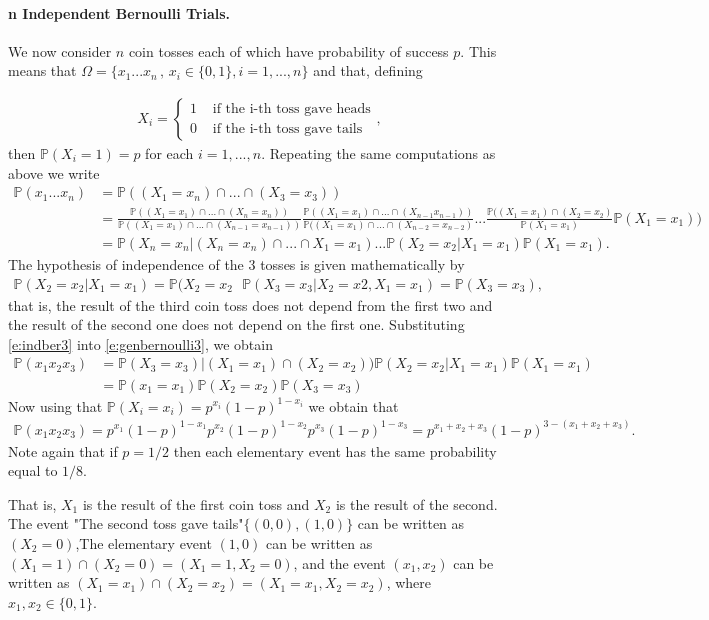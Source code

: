 \documentclass[12pt]{article}
\newcommand{\<}{{\langle \!\! \langle}}
\renewcommand{\>}{{\rangle \!\! \rangle}}
\newcommand{\bel}[2]{\begin{equation} \label{#1} \begin{split} #2
 					\end{split} \end{equation}}
\begin{document}
 \paragraph{ n Independent Bernoulli Trials.}
We now consider $n$ coin tosses each of which have probability of success $p$. This means that $\Omega= \{x_1...x_n\,,\, x_i\in\{0,1\},i=1,...,n\}$ and that, defining

\bel{}{X_i=\begin{cases}
1 & \textrm{ if the i-th toss gave heads}\\
0 & \textrm{ if the i-th toss gave tails}
\end{cases},}
then $\mathbb{P}(X_i = 1) = p$ for each $i=1,...,n$. Repeating the same computations as above we write 
\bel{e:genbernoullin}{\mathbb{P}(x_1...x_n) & =\mathbb{P}((X_1 = x_n)\cap ...\cap (X_3=x_3)) \\
& = \frac{\mathbb{P}((X_1=x_1)\cap ...\cap (X_n=x_n))}{\mathbb{P}((X_1=x_1)\cap ...\cap (X_{n-1}=x_{n-1}))} \frac{\mathbb{P}((X_1=x_1)\cap...\cap (X_{n-1}  x_{n-1}))}{\mathbb{P}((X_1=x_1)\cap ...\cap (X_{n-2}= x_{n-2})}...\frac{\mathbb{P}((X_1 = x_1) \cap (X_2 = x_2) }{\mathbb{P}(X_1 =x_1) } \mathbb{P}(X_1=x_1))\\ & =\mathbb{P}(X_n=x_n|(X_n=x_n)\cap ...\cap X_1=x_1)...\mathbb{P}(X_2=x_2|X_1=x_1)\mathbb{P}(X_1=x_1).}
The hypothesis of independence of the 3 tosses is given mathematically by 
\bel{e:indber3}{\mathbb{P}(X_2=x_2|X_1=x_1)=\mathbb{P}(X_2=x_2 \,\,\,\,\mathbb{P}(X_3=x_3|X_2=x2,X_1=x_1)=\mathbb{P}(X_3=x_3),} that is, the result of the third coin toss does not depend from the first two and the result of the second one does not depend on the first one. Substituting \eqref{e:indber3} into \eqref{e:genbernoulli3}, we obtain
\bel{}{\mathbb{P}(x_1x_2x_3) & = \mathbb{P}(X_3 = x_3)| (X_1 = x_1)\cap (X_2 =x_2) ) \mathbb{P}(X_2 = x_2| X_1 = x_1)\mathbb{P}(X_1 = x_1) \\
 & =\mathbb{P}(x_1 = x_1)\mathbb{P}(X_2 = x_2)\mathbb{P}(X_3 =x_3)}
 Now using that $\mathbb{P}(X_i = x_i) = p^{x_i}(1-p)^{1-x_i}$ we obtain that
 \bel{}{\mathbb{P}(x_1x_2x_3)= p^{x_1}(1-p)^{1-x_1} p^{x_2}(1-p)^{1-x_2} p^{x_3}(1-p)^{1-x_3} = p^{x_1+x_2+x_3}(1-p)^{3-(x_1 + x_2 + x_3)}.}
 Note again that if $p=1/2$ then each elementary event has the same probability equal to $1/8$. 


That is, $X_1$ is the result of the first coin toss and $X_2$ is the result of the second. The event "The second toss gave tails"$\{(0,0),(1,0)\}$ can be written as $(X_2=0)$,The elementary event $(1,0)$ can be written as $(X_1=1)\cap (X_2=0)=(X_1=1,X_2=0)$, and the event $(x_1,x_2)$ can be written as $(X_1=x_1)\cap (X_2=x_2)=(X_1=x_1,X_2=x_2)$, where $x_1,x_2\in\{0,1\}$.
\end{document}

